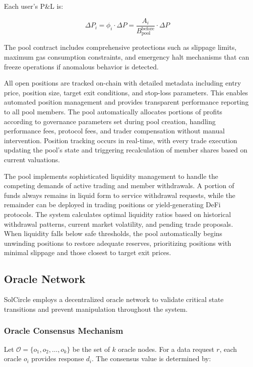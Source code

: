 \documentclass[11pt,a4paper]{article}
\begin{document}
Each user's P\&L is:

\begin{equation}
\Delta P_i = \phi_i \cdot \Delta P = \frac{A_i}{B_{\text{pool}}^{\text{before}}} \cdot \Delta P
\end{equation}

The pool contract includes comprehensive protections such as slippage limits, maximum gas consumption constraints, and emergency halt mechanisms that can freeze operations if anomalous behavior is detected.

All open positions are tracked on-chain with detailed metadata including entry price, position size, target exit conditions, and stop-loss parameters. This enables automated position management and provides transparent performance reporting to all pool members. The pool automatically allocates portions of profits according to governance parameters set during pool creation, handling performance fees, protocol fees, and trader compensation without manual intervention. Position tracking occurs in real-time, with every trade execution updating the pool's state and triggering recalculation of member shares based on current valuations.

The pool implements sophisticated liquidity management to handle the competing demands of active trading and member withdrawals. A portion of funds always remains in liquid form to service withdrawal requests, while the remainder can be deployed in trading positions or yield-generating DeFi protocols. The system calculates optimal liquidity ratios based on historical withdrawal patterns, current market volatility, and pending trade proposals. When liquidity falls below safe thresholds, the pool automatically begins unwinding positions to restore adequate reserves, prioritizing positions with minimal slippage and those closest to target exit prices.

\subsection{Oracle Network}

SolCircle employs a decentralized oracle network to validate critical state transitions and prevent manipulation throughout the system.

\subsubsection{Oracle Consensus Mechanism}

Let $\mathcal{O} = \{o_1, o_2, \ldots, o_k\}$ be the set of $k$ oracle nodes. For a data request $r$, each oracle $o_i$ provides response $d_i$. The consensus value is determined by:
\end{document}
